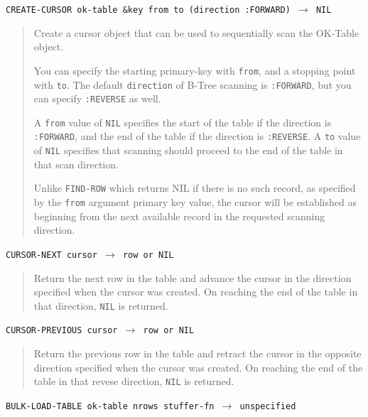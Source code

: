 \documentclass[article,oneside]{memoir}
\begin{document}
\pagebreak[3]
\noindent \texttt{CREATE-CURSOR ok-table \&key from to (direction :FORWARD) $\rightarrow$ NIL}

\begin{quote}
Create a cursor object that can be used to sequentially scan the OK-Table object. 

You can specify the starting primary-key with \texttt{from}, and a stopping point with \texttt{to}. The default \texttt{direction} of B-Tree scanning is \texttt{:FORWARD}, but you can specify \texttt{:REVERSE} as well.

A \texttt{from} value of \texttt{NIL} specifies the start of the table if the direction is \texttt{:FORWARD}, and the end of the table if the direction is \texttt{:REVERSE}. A \texttt{to} value of \texttt{NIL} specifies that scanning should proceed to the end of the table in that scan direction.

Unlike \texttt{FIND-ROW} which returns NIL if there is no such record, as specified by the \texttt{from} argument primary key value, the cursor will be established as beginning from the next available record in the requested scanning direction. 
\end{quote}

\noindent \texttt{CURSOR-NEXT cursor $\rightarrow$ row or NIL}

\begin{quote}
Return the next row in the table and advance the cursor in the direction specified when the cursor was created. On reaching the end of the table in that direction, \texttt{NIL} is returned.
\end{quote}

\noindent \texttt{CURSOR-PREVIOUS cursor $\rightarrow$ row or NIL}

\begin{quote}
Return the previous row in the table and retract the cursor in the opposite direction specified when the cursor was created. On reaching the end of the table in that revese direction, \texttt{NIL} is returned.
\end{quote}

\noindent \texttt{BULK-LOAD-TABLE ok-table nrows stuffer-fn $\rightarrow$ unspecified}
\end{document}

